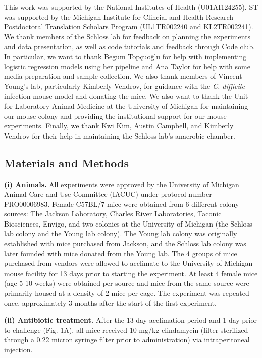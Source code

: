 \documentclass[11pt,]{article}
\begin{document}
This work was supported by the National Institutes of Health
(U01AI124255). ST was supported by the Michigan Institute for Clincial
and Health Research Postdoctoral Translation Scholars Program
(UL1TR002240 and KL2TR002241). We thank members of the Schloss lab for
feedback on planning the experiments and data presentation, as well as
code tutorials and feedback through Code club. In particular, we want to
thank Begum Topçuoğlu for help with implementing logistic regression
models using her
\href{https://github.com/SchlossLab/ML_pipeline_microbiome}{pipeline}
and Ana Taylor for help with some media preparation and sample
collection. We also thank members of Vincent Young's lab, particularly
Kimberly Vendrov, for guidance with the \emph{C. difficile} infection
mouse model and donating the mice. We also want to thank the Unit for
Laboratory Animal Medicine at the University of Michigan for maintaining
our mouse colony and providing the institutional support for our mouse
experiments. Finally, we thank Kwi Kim, Austin Campbell, and Kimberly
Vendrov for their help in maintaining the Schloss lab's anaerobic
chamber.

\newpage

\subsection{Materials and Methods}\label{materials-and-methods}

\textbf{(i) Animals.} All experiments were approved by the University of
Michigan Animal Care and Use Committee (IACUC) under protocol number
PRO00006983. Female C57BL/7 mice were obtained from 6 different colony
sources: The Jackson Laboratory, Charles River Laboratories, Taconic
Biosciences, Envigo, and two colonies at the University of Michigan (the
Schloss lab colony and the Young lab colony). The Young lab colony was
originally established with mice purchased from Jackson, and the Schloss
lab colony was later founded with mice donated from the Young lab. The 4
groups of mice purchased from vendors were allowed to acclimate to the
University of Michigan mouse facility for 13 days prior to starting the
experiment. At least 4 female mice (age 5-10 weeks) were obtained per
source and mice from the same source were primarily housed at a density
of 2 mice per cage. The experiment was repeated once, approximately 3
months after the start of the first experiment.

\textbf{(ii) Antibiotic treatment.} After the 13-day acclimation period
and 1 day prior to challenge (Fig. 1A), all mice received 10 mg/kg
clindamycin (filter sterilized through a 0.22 micron syringe filter
prior to administration) via intraperitoneal injection.
\end{document}
